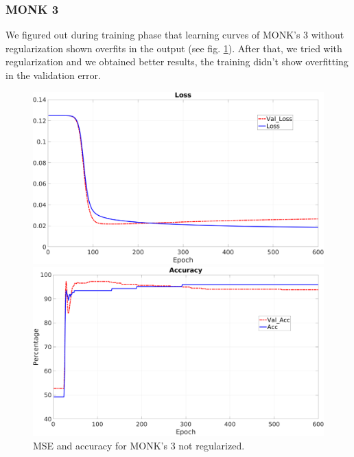 \subsubsection{MONK 3}
We figured out during training phase that learning curves of MONK's 3 without regularization shown overfits in the output (see fig. \ref{fig:m3nr}). After that, we tried with regularization and we obtained better results, the training didn't show overfitting in the validation error.
\begin{figure}[H]
    \centering
    \begin{minipage}[t]{0.5\linewidth}
        \includegraphics[width=\linewidth]{img/Monk3_loss_noReg.png}

    \end{minipage}%
    \begin{minipage}[t]{0.5\linewidth}
        \includegraphics[width=\linewidth]{img/Monk3_accuracy_noReg.png}
    \end{minipage}
    \caption{MSE and accuracy for MONK’s 3 not regularized.}
    \label{fig:m3nr}
\end{figure}

